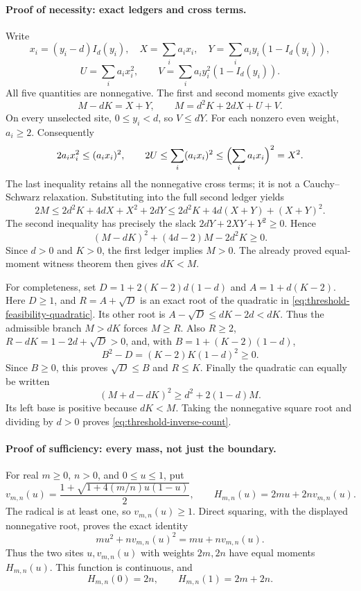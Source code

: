 \paragraph{Proof of necessity: exact ledgers and cross terms.}
Write
\[
 x_i=(y_i-d)I_d(y_i),\quad
 X=\sum_i a_i x_i,\quad
 Y=\sum_i a_i y_i(1-I_d(y_i)),
\]
\[
 U=\sum_i a_i x_i^2,\qquad
 V=\sum_i a_i y_i^2(1-I_d(y_i)).
\]
All five quantities are nonnegative.  The first and second moments give
exactly
\begin{equation}
 M-dK=X+Y,\qquad M=d^2K+2dX+U+V.
 \label{eq:threshold-feasibility-ledgers}
\end{equation}
On every unselected site, \(0\le y_i<d\), so \(V\le dY\).
For each nonzero even weight, \(a_i\ge2\).  Consequently
\[
 2a_i x_i^2\le(a_i x_i)^2,
 \qquad
 2U\le\sum_i(a_i x_i)^2\le\Bigl(\sum_i a_i x_i\Bigr)^2=X^2.
\]
The last inequality retains all the nonnegative cross terms; it is not a
Cauchy--Schwarz relaxation.  Substituting into the full second ledger yields
\[
 2M\le2d^2K+4dX+X^2+2dY
       \le2d^2K+4d(X+Y)+(X+Y)^2.
\]
The second inequality has precisely the slack
\(2dY+2XY+Y^2\ge0\).  Hence
\begin{equation}
 (M-dK)^2+(4d-2)M-2d^2K\ge0.
 \label{eq:threshold-feasibility-quadratic}
\end{equation}
Since \(d>0\) and \(K>0\), the first ledger implies \(M>0\).
The already proved equal-moment witness theorem then gives \(dK<M\).

For completeness, set
\(D=1+2(K-2)d(1-d)\) and \(A=1+d(K-2)\).
Here \(D\ge1\), and \(R=A+\sqrt D\) is an exact root of the
quadratic in \eqref{eq:threshold-feasibility-quadratic}.  Its other root
is \(A-\sqrt D\le dK-2d<dK\).
Thus the admissible branch \(M>dK\) forces \(M\ge R\).
Also \(R\ge2\), \(R-dK=1-2d+\sqrt D>0\), and, with
\(B=1+(K-2)(1-d)\),
\[
 B^2-D=(K-2)K(1-d)^2\ge0.
\]
Since \(B\ge0\), this proves \(\sqrt D\le B\) and \(R\le K\).
Finally the quadratic can equally be written
\[
 (M+d-dK)^2\ge d^2+2(1-d)M.
\]
Its left base is positive because \(dK<M\).  Taking the nonnegative
square root and dividing by \(d>0\) proves
\eqref{eq:threshold-inverse-count}.

\paragraph{Proof of sufficiency: every mass, not just the boundary.}
For real \(m\ge0\), \(n>0\), and \(0\le u\le1\), put
\[
 v_{m,n}(u)=\frac{1+\sqrt{1+4(m/n)u(1-u)}}2,\qquad
 H_{m,n}(u)=2mu+2nv_{m,n}(u).
\]
The radical is at least one, so \(v_{m,n}(u)\ge1\).  Direct squaring,
with the displayed nonnegative root, proves the exact identity
\[
 mu^2+nv_{m,n}(u)^2=mu+nv_{m,n}(u).
\]
Thus the two sites \(u,v_{m,n}(u)\) with weights \(2m,2n\) have equal
moments \(H_{m,n}(u)\).  This function is continuous, and
\[
 H_{m,n}(0)=2n,\qquad H_{m,n}(1)=2m+2n.
\]

